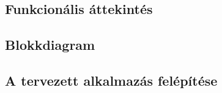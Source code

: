 \chapter*{\attekintes}

\section{Funkcionális áttekintés}

\section{Blokkdiagram}

\section{A tervezett alkalmazás felépítése}